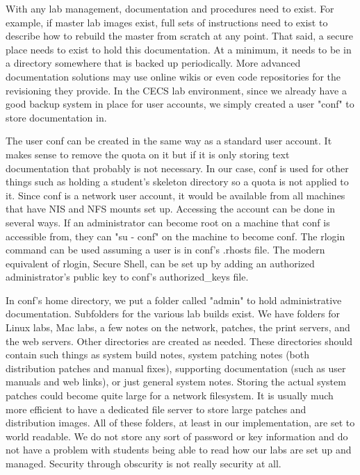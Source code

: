 With any lab management, documentation and procedures need to exist.  For example, if master lab images exist, full sets of instructions need to exist to describe how to rebuild the master from scratch at any point.  That said, a secure place needs to exist to hold this documentation.  At a minimum, it needs to be in a directory somewhere that is backed up periodically.  More advanced documentation solutions may use online wikis or even code repositories for the revisioning they provide.  In the CECS lab environment, since we already have a good backup system in place for user accounts, we simply created a user "conf" to store documentation in.  

The user conf can be created in the same way as a standard user account.  It makes sense to remove the quota on it but if it is only storing text documentation that probably is not necessary.  In our case, conf is used for other things such as holding a student's skeleton directory so a quota is not applied to it.  Since conf is a network user account, it would be available from all machines that have NIS and NFS mounts set up.  Accessing the account can be done in several ways.  If an administrator can become root on a machine that conf is accessible from, they can "su - conf" on the machine to become conf.  The rlogin command can be used assuming a user is in conf's .rhosts file.  The modern equivalent of rlogin, Secure Shell, can be set up by adding an authorized administrator's public key to conf's authorized_keys file.  

In conf's home directory, we put a folder called "admin" to hold administrative documentation.  Subfolders for the various lab builds exist.  We have folders for Linux labs, Mac labs, a few notes on the network, patches, the print servers, and the web servers.  Other directories are created as needed.  These directories should contain such things as system build notes, system patching notes (both distribution patches and manual fixes), supporting documentation (such as user manuals and web links), or just general system notes.  Storing the actual system patches could become quite large for a network filesystem.  It is usually much more efficient to have a dedicated file server to store large patches and distribution images.  All of these folders, at least in our implementation, are set to world readable.  We do not store any sort of password or key information and do not have a problem with students being able to read how our labs are set up and managed.  Security through obscurity is not really security at all.  

